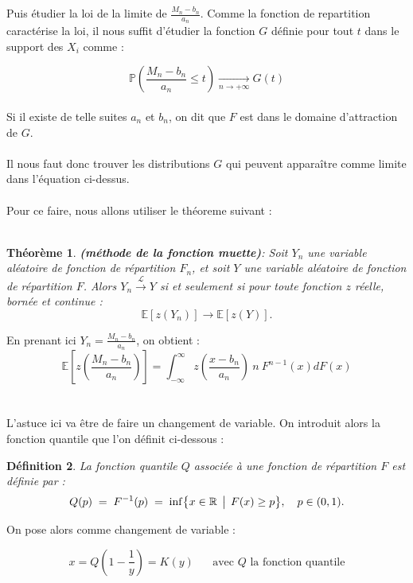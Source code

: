 \documentclass{article}
\theoremstyle{plain}
\newtheorem{definition}{Définition}[section]
\theoremstyle{definition}
\theoremstyle{plain}
\newtheorem{theorem}[definition]{Théorème}
\begin{document}
Puis étudier la loi de la limite de $\frac{M_n - b_n}{a_n}$. Comme la fonction de repartition caractérise la loi, il nous suffit d'étudier la fonction $G$ définie pour tout $t$ dans le support des $X_i$ comme :

\[
\mathbb{P} \left( \frac{M_n - b_n}{a_n} \le t \right) \xrightarrow[n\to +\infty]{} G(t)
\]
\\
Si il existe de telle suites $a_n$ et $b_n$, on dit que $F$ est dans le domaine d'attraction de $G$.
\\
\\
Il nous faut donc trouver les distributions $G$ qui peuvent apparaître comme limite dans l’équation ci-dessus.
\\
\\
Pour ce faire, nous allons utiliser le théoreme suivant : 
\\
\\
\begin{theorem}
\textbf{(méthode de la fonction muette)}:
Soit \( Y_n \) une variable aléatoire de fonction de répartition \( F_n \), et soit \( Y \) une variable aléatoire de fonction de répartition \( F \).  
Alors $Y_n \xrightarrow{\mathcal{L} } Y$ si et seulement si pour toute fonction $z$ réelle, bornée et continue :
\[
\mathbb{E}[z(Y_n)] \to \mathbb{E}[z(Y)].
\]
\end{theorem}
\noindent En prenant ici $Y_n = \frac{M_n -b_n}{a_n}$, on obtient :
\[
\mathbb{E}[z(\frac{M_n -b_n}{a_n})] = \int_{-\infty}^{\infty} z(\frac{x-b_n}{a_n}) \: n \:  F^{n-1} (x)dF(x)
\]
\\
\\
L'astuce ici va être de faire un changement de variable. On introduit alors la fonction quantile que l'on définit ci-dessous :
\begin{definition}
La fonction quantile \(Q\) associée à une fonction de répartition \(F\) est définie par :
\[
Q(p) \;=\; F^{-1}(p)
\;=\;
\inf\bigl\{x\in\mathbb{R}\,\bigm|\,F(x)\ge p\bigr\},
\quad p\in(0,1).
\]
\end{definition}
\medskip 
\noindent On pose alors comme changement de variable : 

\[
x = Q(1-\frac{1}{y}) = K(y) \; \; \; \; \; \; \text{avec $Q$ la fonction quantile}
\]
\end{document}
